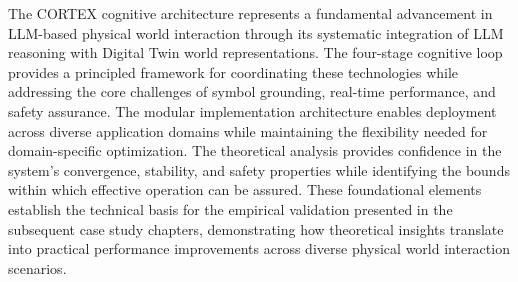 The CORTEX cognitive architecture represents a fundamental advancement in LLM-based physical world interaction through its systematic integration of LLM reasoning with Digital Twin world representations. The four-stage cognitive loop provides a principled framework for coordinating these technologies while addressing the core challenges of symbol grounding, real-time performance, and safety assurance. The modular implementation architecture enables deployment across diverse application domains while maintaining the flexibility needed for domain-specific optimization. The theoretical analysis provides confidence in the system's convergence, stability, and safety properties while identifying the bounds within which effective operation can be assured. These foundational elements establish the technical basis for the empirical validation presented in the subsequent case study chapters, demonstrating how theoretical insights translate into practical performance improvements across diverse physical world interaction scenarios.